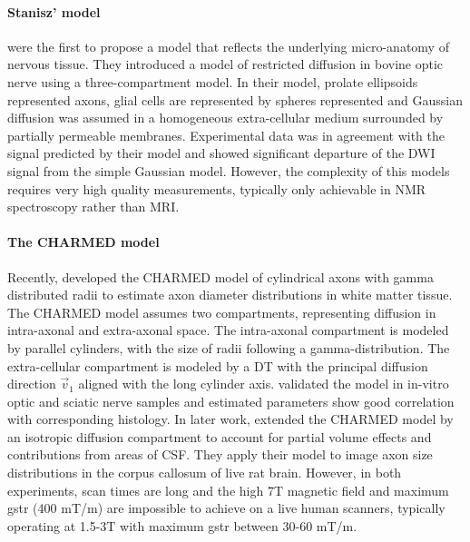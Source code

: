 \paragraph*{Stanisz' model}
\cite{Stanisz:1997} were the first to propose a model that reflects the underlying micro-anatomy of nervous tissue. They introduced a model of restricted diffusion in bovine optic nerve using a three-compartment model. In their model, prolate ellipsoids represented axons, glial cells are represented by spheres represented and Gaussian diffusion was assumed in a homogeneous extra-cellular medium surrounded by partially permeable membranes. Experimental data was in agreement with the signal predicted by their model and showed significant departure of the {\gls{DWI}} signal from the simple Gaussian model. However, the complexity of this models requires very high quality measurements, typically only achievable in NMR spectroscopy rather than MRI.
\paragraph*{The CHARMED model} 
Recently, \citet{Assaf:2005} developed the CHARMED model of cylindrical axons with gamma distributed radii to estimate axon diameter distributions in white matter tissue. The CHARMED model assumes two compartments, representing diffusion in intra-axonal and extra-axonal space. The intra-axonal compartment is modeled by parallel cylinders, with the size of radii following a gamma-distribution. The extra-cellular compartment is modeled by a {\gls{DT}} with the principal diffusion direction $\vec{v}_1$ aligned with the long cylinder axis. \citet{Alexander:2008} validated the model in in-vitro optic and sciatic nerve samples and estimated parameters show good correlation with corresponding histology. In later work, \citet{Barazany:2009} extended the CHARMED model by an isotropic diffusion compartment to account for partial volume effects and contributions from areas of {\gls{CSF}}. They apply their model to image axon size distributions in the corpus callosum of live rat brain. However, in both experiments, scan times are long and the high 7T magnetic field and maximum {\gls{gstr}} (400 mT/m) are impossible to achieve on a live human scanners, typically operating at 1.5-3T with maximum {\gls{gstr}} between 30-60 mT/m.

